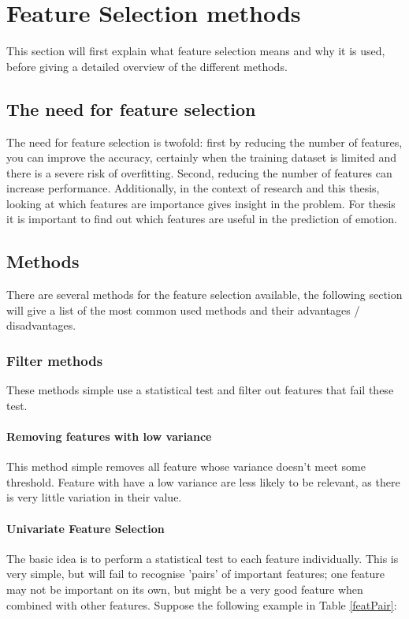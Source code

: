 \chapter{Feature Selection methods}
{\samenvatting This section will first explain what feature selection means and why it is used, before giving a detailed overview of the different methods.}

\section{The need for feature selection}
The need for feature selection is twofold: first by reducing the number of features, you can improve the accuracy, certainly when the training dataset is limited and there is a severe risk of overfitting. Second, reducing the number of features can increase performance. Additionally, in the context of research and this thesis, looking at which features are importance gives insight in the problem. For thesis it is important to find out which features are useful in the prediction of emotion.


\section{Methods}




There are several methods for the feature selection available, the following section will give a list of the most common used methods and their advantages / disadvantages.

\subsection{Filter methods}
These methods simple use a statistical test and filter out features that fail these test. 

\subsubsection{Removing features with low variance}
This method simple removes all feature whose variance doesn't meet some threshold. Feature with have a low variance are less likely to be relevant, as there is very little variation in their value.

\subsubsection{Univariate Feature Selection}
The basic idea is to perform a statistical test to each feature individually. This is very simple, but will fail to recognise 'pairs' of important features; one feature may not be important on its own, but might be a very good feature when combined with other features. Suppose the following example in Table \ref{featPair}:

